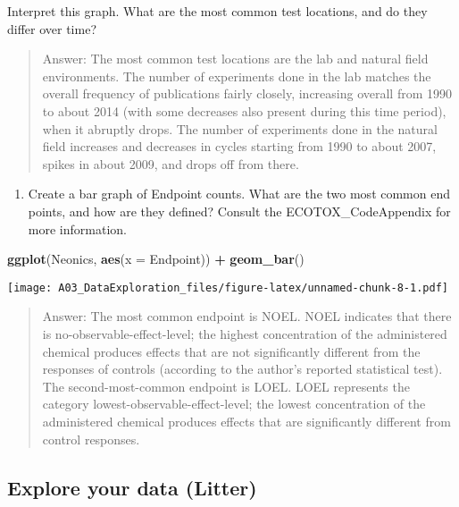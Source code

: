 \documentclass[]{article}
\newenvironment{Shaded}{\begin{snugshade}}{\end{snugshade}}
\newcommand{\DataTypeTok}[1]{\textcolor[rgb]{0.13,0.29,0.53}{#1}}
\newcommand{\KeywordTok}[1]{\textcolor[rgb]{0.13,0.29,0.53}{\textbf{#1}}}
\newcommand{\NormalTok}[1]{#1}
\newcommand{\OperatorTok}[1]{\textcolor[rgb]{0.81,0.36,0.00}{\textbf{#1}}}
\newcommand{\StringTok}[1]{\textcolor[rgb]{0.31,0.60,0.02}{#1}}
\providecommand{\tightlist}{%
  \setlength{\itemsep}{0pt}\setlength{\parskip}{0pt}}
\begin{document}
Interpret this graph. What are the most common test locations, and do
they differ over time?

\begin{quote}
Answer: The most common test locations are the lab and natural field
environments. The number of experiments done in the lab matches the
overall frequency of publications fairly closely, increasing overall
from 1990 to about 2014 (with some decreases also present during this
time period), when it abruptly drops. The number of experiments done in
the natural field increases and decreases in cycles starting from 1990
to about 2007, spikes in about 2009, and drops off from there.
\end{quote}

\begin{enumerate}
\def\labelenumi{\arabic{enumi}.}
\setcounter{enumi}{10}
\tightlist
\item
  Create a bar graph of Endpoint counts. What are the two most common
  end points, and how are they defined? Consult the ECOTOX\_CodeAppendix
  for more information.
\end{enumerate}

\begin{Shaded}
\begin{Highlighting}[]
\KeywordTok{ggplot}\NormalTok{(Neonics, }\KeywordTok{aes}\NormalTok{(}\DataTypeTok{x =}\NormalTok{ Endpoint)) }\OperatorTok{+}\StringTok{ }
\StringTok{  }\KeywordTok{geom_bar}\NormalTok{()}
\end{Highlighting}
\end{Shaded}

\texttt{[image: A03\_DataExploration\_files/figure-latex/unnamed-chunk-8-1.pdf]}

\begin{quote}
Answer: The most common endpoint is NOEL. NOEL indicates that there is
no-observable-effect-level; the highest concentration of the
administered chemical produces effects that are not significantly
different from the responses of controls (according to the author's
reported statistical test). The second-most-common endpoint is LOEL.
LOEL represents the category lowest-observable-effect-level; the lowest
concentration of the administered chemical produces effects that are
significantly different from control responses.
\end{quote}

\hypertarget{explore-your-data-litter}{%
\subsection{Explore your data (Litter)}\label{explore-your-data-litter}}
\end{document}
